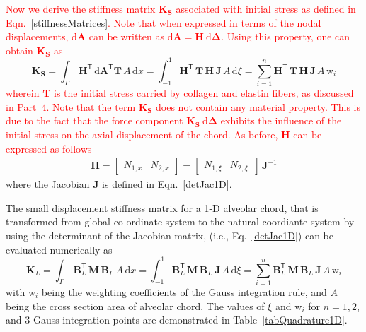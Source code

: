 \textcolor{red}{Now we derive the stiffness matrix $\mathbf{K}_\mathbf{S}$ associated with initial stress as defined in Eqn.~\eqref{stiffnessMatrices}. Note that when expressed in terms of the nodal displacements, $\mathrm{d}\mathbf{A}$ can be written as $\mathrm{d}\mathbf{A}=\mathbf{H}\:\mathrm{d}\boldsymbol{\Delta}$. Using this property, one can obtain $\mathbf{K_S}$ as}
\begin{equation}
\mathbf{K}_\mathbf{S} = \int_{\Gamma} \, \mathbf{H}^{\mathsf{T}} \, \mathrm{d} \mathbf{A}^{\mathsf{T}} \mathbf{T} \, A \, \mathrm{d} x 
= \int_{-1}^{1} \mathbf{H}^{\mathsf{T}} \,  \mathbf{T} \, \mathbf{H} \, \mathbf{J}  \, A \,  \mathrm{d} \xi
= \sum_{i=1}^{n}  \mathbf{H}^{\mathsf{T}} \, \mathbf{T} \, \mathbf{H}  \, \mathbf{J} \, A \, \mathrm{w}_i
\end{equation}
\textcolor{red}{wherein $\mathbf{T}$ is the initial stress carried by collagen and elastin fibers, as discussed in Part~4. Note that the term $\mathbf{K_S}$ does not contain any material property. This is due to the fact that the force component $\mathbf{K_S}\:\mathrm{d}\boldsymbol{\Delta}$ exhibits the influence of the initial stress on the axial displacement of the chord. As before, $\mathbf{H}$ can be expressed as follows}
\begin{equation}
\begin{aligned}
\mathbf{H} = \begin{bmatrix}
N_{1,x} &  N_{2,x}
\end{bmatrix} = \begin{bmatrix}
N_{1,\xi} & N_{2,\xi} \, 
\end{bmatrix} \, \mathbf{J}^{-1}
\end{aligned}
\end{equation}
where the Jacobian $\mathbf{J}$ is defined in Eqn.~\ref{detJac1D}.

The small displacement stiffness matrix for a 1-D alveolar chord, that is transformed from global co-ordinate system to the natural coordiante system by using the determinant of the Jacobian matrix, (i.e., Eq.~\eqref{detJac1D}) can be evaluated numerically as 
\begin{equation}
\mathbf{K}_{L} = \int_{\Gamma} \, \mathbf{B}_L^{\mathsf{T}} \, \mathbf{M} \, \mathbf{B}_L \, A \, \mathrm{d} x  = \int_{-1}^{1} \mathbf{B}_L^{\mathsf{T}} \, \mathbf{M} \, \mathbf{B}_L \, \mathbf{J}  \, A \,  \mathrm{d} \xi =  \sum_{i=1}^{n}  \mathbf{B}_L^{\mathsf{T}} \, \mathbf{M} \, \mathbf{B}_L \, \mathbf{J} \, A \, \mathrm{w}_i
\end{equation}
with $\mathrm{w}_i$ being the  weighting coefficients of the Gauss integration rule, and $A$ being the cross section area of alveolar chord. The values of $\xi$ and $\mathrm{w}_i$ for $n = 1, 2$, and $3$ Gauss integration points are demonstrated in Table~\ref{tabQuadrature1D}.

